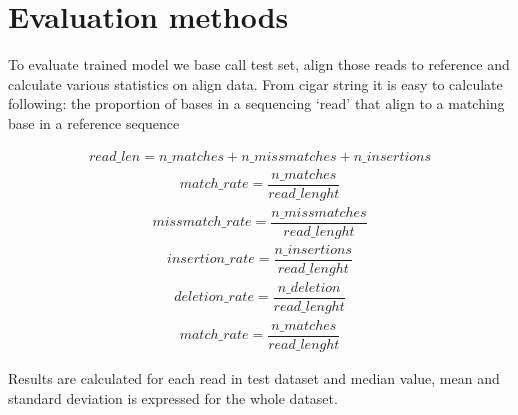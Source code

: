 \documentclass[times, utf8, diplomski, numeric, english]{fer}
\begin{document}
\section{Evaluation methods}
To evaluate trained model we base call test set, align those reads to reference and calculate various statistics on align data.
From cigar string it is easy to calculate following:
the proportion of bases in a sequencing ‘read’ that align to a matching base in a reference sequence

\begin{equation}
\begin{gathered}
read\_len =  n\_matches + n\_missmatches + n\_insertions 
\end{gathered}
\end{equation}
\begin{equation}
\begin{gathered}
match\_rate = \dfrac{n\_matches}{read\_lenght}
\end{gathered}
\end{equation}
\begin{equation}
\begin{gathered}
missmatch\_rate = \dfrac{n\_missmatches}{read\_lenght}
\end{gathered}
\end{equation}
\begin{equation}
\begin{gathered}
insertion\_rate = \dfrac{n\_insertions}{read\_lenght}
\end{gathered}
\end{equation}
\begin{equation}
\begin{gathered}
deletion\_rate = \dfrac{n\_deletion}{read\_lenght}
\end{gathered}
\end{equation}
\begin{equation}
\begin{gathered}
match\_rate = \dfrac{n\_matches}{read\_lenght}
\end{gathered}
\end{equation}

Results are calculated for each read in test dataset and median value, mean and standard deviation is expressed for the whole dataset.
\end{document}
